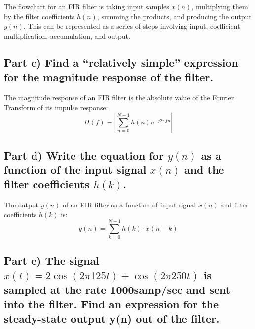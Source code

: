 \documentclass{article}
\begin{document}
The flowchart for an FIR filter is taking input samples \(x(n)\), multiplying them by the filter coefficients \(h(n)\), summing the products, and producing the output \(y(n)\). This can be represented as a series of steps involving input, coefficient multiplication, accumulation, and output.
\begin{center}
    \end{center}
    
\subsection*{Part c) Find a “relatively simple” expression for the magnitude response of the filter.}

The magnitude response of an FIR filter is the absolute value of the Fourier Transform of its impulse response:
\[ H(f) = \left| \sum_{n=0}^{N-1} h(n) e^{-j2\pi fn} \right| \]

\subsection*{Part d) Write the equation for \(y(n)\) as a function of the input signal \(x(n)\) and the filter coefficients
\(h(k)\).}

The output \(y(n)\) of an FIR filter as a function of input signal \(x(n)\) and filter coefficients \(h(k)\) is:
\[ y(n) = \sum_{k=0}^{N-1} h(k) \cdot x(n-k) \]

\subsection*{Part e) The signal \(x(t) = 2\cos(2\pi125t) + \cos(2\pi250t)\) is sampled at the rate 1000samp/sec and sent into the filter. Find an expression for the steady-state output y(n) out of the filter.}
\end{document}
